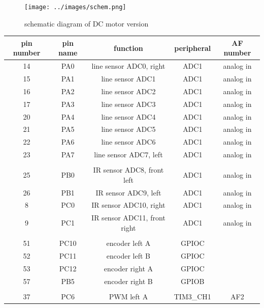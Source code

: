 \documentclass[12pt,twoside,onecolumn,openany,extrafontsizes,dvipsnames]{memoir}
\begin{document}
\newpage
\begin{figure}[h]
    \centering
    \texttt{[image: ../images/schem.png]}
    \caption{schematic diagram of DC motor version}
\end{figure}

\newpage

    \begin{table}[h!]
        \centering
            \begin{tabular}{||c c c c c||} 
            \hline
            pin number & pin name & function & peripheral & AF number \\
            \hline\hline
                14 & PA0 & line sensor ADC0, right & ADC1 & analog in \\ 
                15 & PA1 & line sensor ADC1 & ADC1 & analog in \\ 
                16 & PA2 & line sensor ADC2 & ADC1 & analog in \\ 
                17 & PA3 & line sensor ADC3 & ADC1 & analog in \\ 
                20 & PA4 & line sensor ADC4 & ADC1 & analog in \\ 
                21 & PA5 & line sensor ADC5 & ADC1 & analog in \\ 
                22 & PA6 & line sensor ADC6 & ADC1 & analog in \\ 
                23 & PA7 & line sensor ADC7, left & ADC1 & analog in \\ 
                & & & & \\
                25 & PB0 & IR sensor ADC8, front left  & ADC1 & analog in \\ 
                26 & PB1 & IR sensor ADC9, left & ADC1 & analog in \\ 
                8 & PC0 & IR sensor ADC10, right & ADC1 & analog in \\ 
                9 & PC1 & IR sensor ADC11, front right & ADC1 & analog in \\ 
                & & & & \\
                51 & PC10 & encoder left A  & GPIOC &  \\ 
                52 & PC11 & encoder left B  & GPIOC &  \\ 
                53 & PC12 & encoder right A  & GPIOC &  \\ 
                57 & PB5  & encoder right B  & GPIOB &  \\ 
                & & & & \\
                37 & PC6 & PWM left A   & TIM3\_CH1 & AF2 \\     

\end{tabular}
\end{table}
\end{document}

